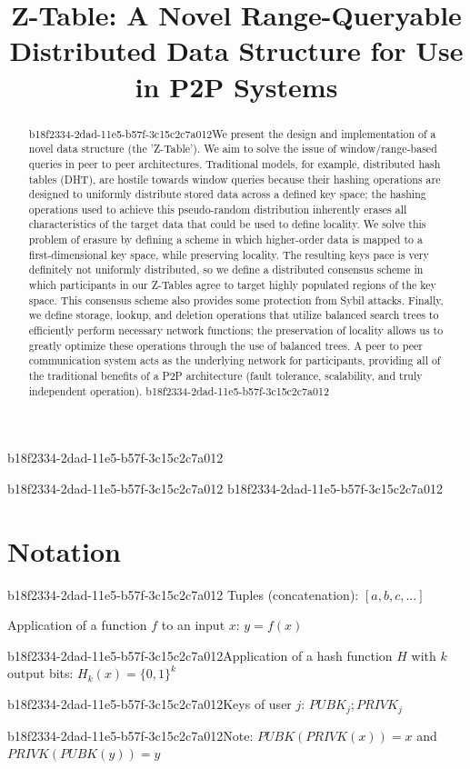 \documentclass[12pt]{article}
\title{Z-Table: A Novel Range-Queryable Distributed Data Structure for Use in P2P Systems}
\begin{document}
\maketitle
b18f2334-2dad-11e5-b57f-3c15c2c7a012
\begin{abstract}
b18f2334-2dad-11e5-b57f-3c15c2c7a012We present the design and implementation of a novel data structure (the 'Z-Table'). We aim to solve the issue of window/range-based queries in peer to peer architectures. Traditional models, for example,  distributed hash tables (DHT), are hostile towards window queries because their hashing operations are designed to uniformly distribute stored data across a defined key space; the hashing operations used to achieve this pseudo-random distribution inherently erases all characteristics of the target data that could be used to define locality. We solve this problem of erasure by defining a scheme in which higher-order data is mapped to a first-dimensional key space, while preserving locality. The resulting keys pace is very definitely not uniformly distributed, so we define a distributed consensus scheme in which participants in our Z-Tables agree to target highly populated regions of the key space. This consensus scheme also provides some protection from Sybil attacks. Finally, we define storage, lookup, and deletion operations that utilize balanced search trees to efficiently perform necessary network functions; the preservation of locality allows us to greatly optimize these operations through the use of balanced trees. A peer to peer communication system acts as the underlying network for participants, providing all of the traditional benefits of a P2P architecture (fault tolerance, scalability, and truly independent operation).
b18f2334-2dad-11e5-b57f-3c15c2c7a012\end{abstract}
b18f2334-2dad-11e5-b57f-3c15c2c7a012
b18f2334-2dad-11e5-b57f-3c15c2c7a012\section{Notation}
b18f2334-2dad-11e5-b57f-3c15c2c7a012
Tuples (concatenation): $[a,b,c,...]$

Application of a function $f$ to an input $x$: $y=f(x)$

b18f2334-2dad-11e5-b57f-3c15c2c7a012Application of a hash function $H$ with $k$ output bits: $H_{k}(x) = \{0,1\}^k$

b18f2334-2dad-11e5-b57f-3c15c2c7a012Keys of user $j$: $ PUBK_j; PRIVK_j $

b18f2334-2dad-11e5-b57f-3c15c2c7a012Note: $PUBK(PRIVK(x)) = x$ and $PRIVK(PUBK(y)) = y$~
\end{document}
